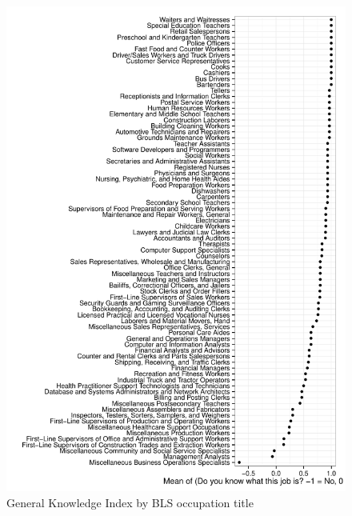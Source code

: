 \documentclass[11pt]{article}
\begin{document}
\begin{figure}
\caption{General Knowledge Index by BLS occupation title \label{fig:knowledge_by_occupation}} 
\centering
\begin{minipage}{0.85 \linewidth}
\includegraphics[width = \linewidth]{./plots/knowledge_by_occupation.pdf}
\end{minipage}  
\end{figure} 
\end{document}
